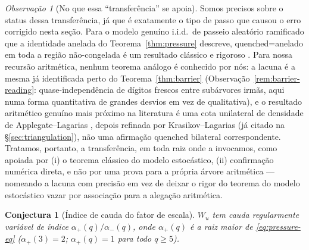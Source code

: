 \documentclass[11pt]{article}
\newtheorem{conjecture}[theorem]{Conjectura}
\theoremstyle{definition}
\theoremstyle{remark}
\newtheorem{remark}[theorem]{Observação}
\begin{document}
\begin{remark}[No que essa ``transferência'' se apoia]\label{rem:transfer-basis}
Somos precisos sobre o status dessa transferência, já que é exatamente
o tipo de passo que causou o erro corrigido nesta seção. Para o modelo
genuíno i.i.d.\ de passeio aleatório ramificado que a identidade
anelada do Teorema~\ref{thm:pressure} descreve, quenched=anelado em
toda a região não-congelada é um resultado clássico e rigoroso
\cite{Biggins1992}. Para nossa recursão aritmética, nenhum teorema
análogo é conhecido por nós: a lacuna é a mesma já identificada perto
do Teorema~\ref{thm:barrier} (Observação~\ref{rem:barrier-reading}:
quase-independência de dígitos frescos entre subárvores irmãs, aqui
numa forma quantitativa de grandes desvios em vez de qualitativa), e o
resultado aritmético genuíno mais próximo na
literatura é uma cota unilateral de densidade de
Applegate--Lagarias \cite{ApplegateLagarias1995I,ApplegateLagarias1995II},
depois refinada por Krasikov--Lagarias \cite{KrasikovLagarias2003} (já
citado na \S\ref{sec:triangulation}), não uma afirmação quenched
bilateral correspondente. Tratamos, portanto, a transferência, em toda
raiz onde a invocamos, como apoiada por (i) o teorema clássico do
modelo estocástico, (ii) confirmação numérica direta, e não por uma
prova para a própria árvore aritmética --- nomeando a lacuna com
precisão em vez de deixar o rigor do teorema do modelo estocástico
vazar por associação para a alegação aritmética.
\end{remark}

\begin{conjecture}[Índice de cauda do fator de escala]\label{conj:tail-index}
$W_u$ tem cauda regularmente variável de índice
$\alpha_+(q)/\alpha_-(q)$, onde $\alpha_+(q)$ é a raiz maior de
\eqref{eq:pressure-eq} ($\alpha_+(3)=2$; $\alpha_+(q)=1$ para todo
$q\ge5$).
\end{conjecture}
\end{document}
